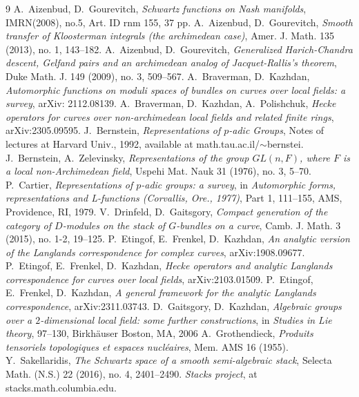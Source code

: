 \documentclass[12pt,reqno]{amsart}
\theoremstyle{definition}
\theoremstyle{remark}
\numberwithin{equation}{section}
\begin{document}
\begin{thebibliography}{9}
 A.~Aizenbud, D.~Gourevitch, {\it Schwartz functions on Nash manifolds}, IMRN(2008), no.5, Art. ID rnm 155, 37 pp.
 A.~Aizenbud, D.~Gourevitch, {\it Smooth transfer of Kloosterman integrals (the archimedean case)}, 
Amer. J. Math. 135 (2013), no. 1, 143--182.
 A.~Aizenbud, D.~Gourevitch, {\it Generalized Harich-Chandra descent, Gelfand pairs and an archimedean analog of Jacquet-Rallis's theorem},
Duke Math. J. 149 (2009), no. 3, 509--567.
 A.~Braverman, D.~Kazhdan, {\it Automorphic functions on moduli spaces of bundles on curves over local fields: a survey}, arXiv: 2112.08139. 
 A.~Braverman, D.~Kazhdan, A.~Polishchuk, {\it Hecke operators for curves over non-archimedean local fields and related finite rings}, arXiv:2305.09595.
 J.~Bernstein, {\it Representations of $p$-adic Groups}, Notes of lectures at Harvard Univ., 1992, available at 
math.tau.ac.il/$\sim$bernstei.
 J.~Bernstein, A.~Zelevinsky,
{\it Representations of the group  $GL(n,F)$,  where  $F$  is a local non-Archimedean field}, Uspehi Mat. Nauk 31 (1976), no. 3, 5--70.
 P.~Cartier, {\it Representations of $p$-adic groups: a survey}, in {\it Automorphic forms, representations and L-functions (Corvallis, Ore., 1977)}, Part 1, 111--155,
AMS, Providence, RI, 1979.
 V.~Drinfeld, D.~Gaitsgory,
{\it Compact generation of the category of $D$-modules on the stack of  $G$-bundles on a curve}, Camb. J. Math. 3 (2015), no. 1-2, 19--125.
 P.~Etingof, E.~Frenkel, D.~Kazhdan, {\it An analytic version of the Langlands correspondence for complex curves}, arXiv:1908.09677. 
 P.~Etingof, E.~Frenkel, D.~Kazhdan, {\it Hecke operators and analytic Langlands correspondence for curves over local fields}, arXiv:2103.01509.
 P.~Etingof, E.~Frenkel, D.~Kazhdan, {\it A general framework for the analytic Langlands correspondence}, arXiv:2311.03743.
 D.~Gaitsgory, D.~Kazhdan, {\it Algebraic groups over a $2$-dimensional local field: some further constructions}, in 
{\it Studies in Lie theory}, 97--130, Birkh\"auser Boston, MA, 2006
 A.~Grothendieck, {\it Produits tensoriels topologiques et espaces nucl\'eaires}, Mem. AMS 16 (1955).
 Y.~Sakellaridis, {\it The Schwartz space of a smooth semi-algebraic stack}, Selecta Math. (N.S.) 22 (2016), no. 4, 2401--2490.
 {\it Stacks project}, at stacks.math.columbia.edu.
\end{thebibliography}
\end{document}
